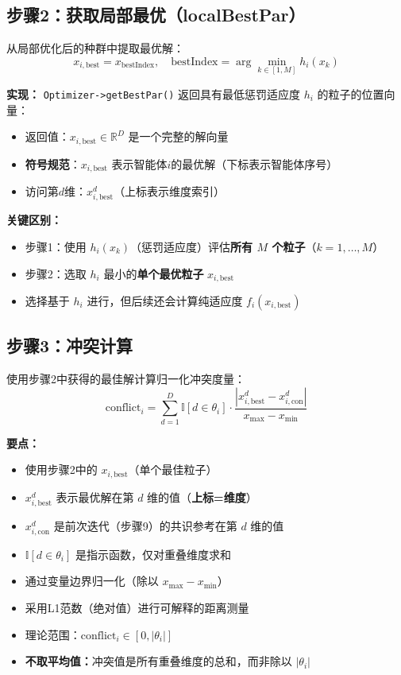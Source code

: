 \documentclass[11pt,a3paper]{ctexart}
\begin{document}
\subsection{步骤2：获取局部最优（localBestPar）}

从局部优化后的种群中提取最优解：
\begin{equation}
x_{i,\text{best}} = x_{\text{bestIndex}}, \quad \text{bestIndex} = \arg\min_{k \in [1,M]} h_i(x_k)
\end{equation}

\textbf{实现：} \texttt{Optimizer->getBestPar()} 返回具有最低惩罚适应度 $h_i$ 的粒子的位置向量：
\begin{itemize}
    \item 返回值：$x_{i,\text{best}} \in \mathbb{R}^{D}$ 是一个完整的解向量
    \item \textbf{符号规范}：$x_{i,\text{best}}$ 表示智能体$i$的最优解（下标表示智能体序号）
    \item 访问第$d$维：$x_{i,\text{best}}^d$（上标表示维度索引）
\end{itemize}

\textbf{关键区别：}
\begin{itemize}
    \item 步骤1：使用 $h_i(x_k)$（惩罚适应度）评估\textbf{所有 $M$ 个粒子}（$k=1,\ldots,M$）
    \item 步骤2：选取 $h_i$ 最小的\textbf{单个最优粒子} $x_{i,\text{best}}$
    \item 选择基于 $h_i$ 进行，但后续还会计算纯适应度 $f_i(x_{i,\text{best}})$
\end{itemize}
\subsection{步骤3：冲突计算}
使用步骤2中获得的最佳解计算归一化冲突度量：
\begin{equation}
\text{conflict}_i = \sum_{d=1}^{D} \mathbb{I}[d \in \theta_i] \cdot \frac{|x_{i,\text{best}}^d - x_{i,\text{con}}^d|}{x_{\max} - x_{\min}}
\end{equation}

\textbf{要点：}
\begin{itemize}
    \item 使用步骤2中的 $x_{i,\text{best}}$（单个最佳粒子）
    \item $x_{i,\text{best}}^d$ 表示最优解在第 $d$ 维的值（\textbf{上标=维度}）
    \item $x_{i,\text{con}}^d$ 是前次迭代（步骤9）的共识参考在第 $d$ 维的值
    \item $\mathbb{I}[d \in \theta_i]$ 是指示函数，仅对重叠维度求和
    \item 通过变量边界归一化（除以 $x_{\max} - x_{\min}$）
    \item 采用L1范数（绝对值）进行可解释的距离测量
    \item 理论范围：$\text{conflict}_i \in [0, |\theta_i|]$
    \item \textbf{不取平均值：}冲突值是所有重叠维度的总和，而非除以 $|\theta_i|$
\end{itemize}
\end{document}
